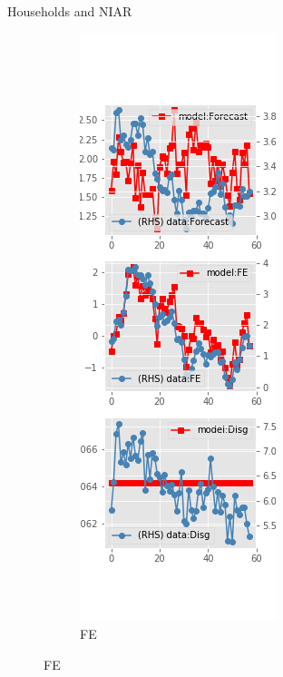 \documentclass{beamer}
\begin{document}
\begin{frame}{Households and NIAR}
	\begin{figure}[ht]
		\label{NI_diag_SCE}
		\begin{subfigure}[b]{0.2\textwidth}
			\centering
			\caption{FE}
			\includegraphics[width=\textwidth, height = 0.8\textheight]{figuresDraft/sce_ni_est_diag0.png}

\end{subfigure}
\end{figure}
\end{frame}
\end{document}
